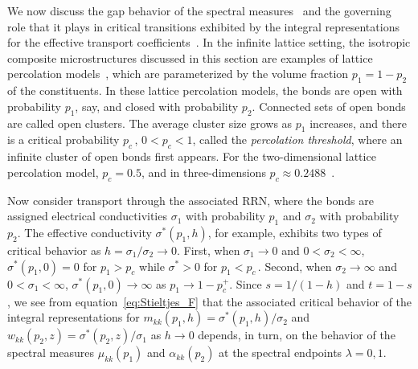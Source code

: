 \documentclass{cmslatex}
\begin{document}
We now discuss the gap behavior of the spectral
measures~\cite{Murphy:JMP:063506,Jonckheere_Luck_JPA_1998} and the
governing role that it plays in critical transitions exhibited by the integral
representations for the effective transport
coefficients~\cite{Murphy:JMP:063506,Golden:PRL-3935}. In the     
infinite lattice setting, the isotropic composite microstructures
discussed in this section are examples of lattice percolation
models~\cite{Stauffer-92,Torquato:RHM-02}, which are parameterized by
the volume fraction $p_1=1-p_2$ of the constituents. In these 
lattice percolation models, the bonds are open with probability $p_1$,
say, and closed with probability $p_2$. Connected sets of open bonds
are called open clusters. The average cluster size grows as $p_1$
increases, and there is a critical probability $p_c\,$, $0<p_c<1$,
called the \emph{percolation threshold}, where an infinite cluster of
open bonds first appears. For the two-dimensional lattice percolation
model, $p_c=0.5$, and in three-dimensions
$p_c\approx0.2488$~\cite{Stauffer-92,Torquato:RHM-02}. 



Now consider transport through the
associated RRN, where the bonds are assigned electrical conductivities 
$\sigma_1$ with probability $p_1$ and $\sigma_2$ with probability $p_2$. The
effective conductivity $\sigma^*(p_1,h)$, for example, exhibits two types
of critical behavior as $h=\sigma_1/\sigma_2\to0$. First, when $\sigma_1\to0$ and
$0<\sigma_2<\infty$, $\sigma^*(p_1,0)=0$ for $p_1>p_c$ while $\sigma^*>0$ for
$p_1<p_c\,$. Second, when $\sigma_2\to\infty$ and $0<\sigma_1<\infty$, $\sigma^*(p_1,0) \to \infty$ as
$p_1\to 1-p_c^+$. Since $s=1/(1-h)$ and $t=1-s$, we see
from equation~\eqref{eq:Stieltjes_F} that the associated critical
behavior of the integral representations for
$m_{kk}(p_1,h)=\sigma^*(p_1,h)/\sigma_2$ and $w_{kk}(p_2,z)=\sigma^*(p_2,z)/\sigma_1$ as
$h\to0$ depends, in turn, on the behavior of the spectral measures
$\mu_{kk}(p_1)$ and $\alpha_{kk}(p_2)$ at the spectral endpoints $\lambda=0,1$. 
\end{document}
